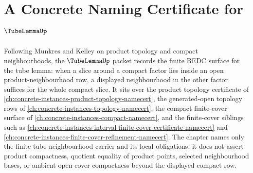 \chapter{A Concrete Naming Certificate for $\TubeLemmaUp$}
\label{ch:concrete-instances-tube-lemma-namecert}

Following Munkres and Kelley on product topology and compact neighbourhoods, the $\TubeLemmaUp$ packet records the finite BEDC surface for the tube lemma: when a slice around a compact factor lies inside an open product-neighbourhood row, a displayed neighbourhood in the other factor suffices for the whole compact slice. It sits over the product topology certificate of \autoref{ch:concrete-instances-product-topology-namecert}, the generated-open topology rows of \autoref{ch:concrete-instances-topology-namecert}, the compact finite-cover surface of \autoref{ch:concrete-instances-compact-namecert}, and the finite-cover siblings such as \autoref{ch:concrete-instances-interval-finite-cover-certificate-namecert} and \autoref{ch:concrete-instances-finite-cover-refinement-namecert}. The chapter names only the finite tube-neighbourhood carrier and its local obligations; it does not assert product compactness, quotient equality of product points, selected neighbourhood bases, or ambient open-cover compactness beyond the displayed compact row.

